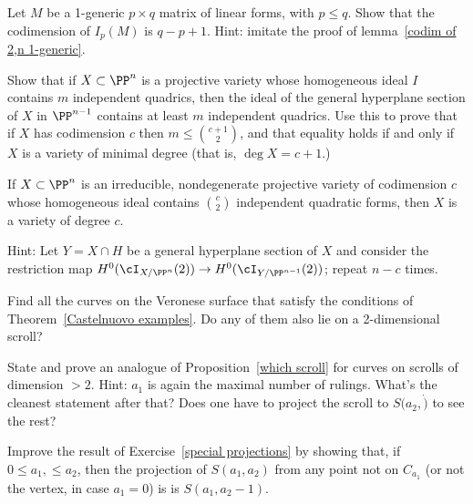 \begin{exercise}
Let $M$ be a 1-generic $p\times q$ matrix of linear forms, with $p\leq q$. Show that the codimension of
$I_p(M)$ is $q-p+1$. Hint: imitate the proof of lemma~\ref{codim of 2,n 1-generic}.
\end{exercise}

\begin{exercise}
Show that if $X\subset \PP^n$ is a projective variety whose homogeneous ideal $I$ contains $m$ independent quadrics, then the ideal of the general hyperplane section of $X$ in $\PP^{n-1}$
contains at least $m$ independent quadrics. Use this to prove that if $X$ has codimension $c$ then $m\leq {c+1\choose 2}$, and that equality holds if and only if
$X$ is a variety of minimal degree (that is, $\deg X = c+1$.)
\end{exercise}

\begin{exercise}\label{many quadrics}
 If $X \subset \PP^n$ is an irreducible, nondegenerate projective variety of codimension $c$ whose homogeneous ideal
 contains ${c\choose 2}$ independent quadratic forms, then $X$ is a variety of degree $c$.
 
Hint: Let $Y = X \cap H$ be a general hyperplane section of $X$ and consider the restriction map $H^0(\cI_{X/\PP^n}(2)) \to H^0(\cI_{Y/\PP^{n-1}}(2))$; repeat $n-c$ times.
\end{exercise}

\begin{exercise}\label{Castelnuovo Veronese}
Find all the curves on the Veronese surface that satisfy the conditions of 
 Theorem~\ref{Castelnuovo examples}. Do any of them also lie on a 2-dimensional scroll?
\end{exercise}


\begin{exercise}
State and prove an analogue of Proposition~\ref{which scroll} for curves on scrolls of dimension $>2$.
Hint: $a_1$ is again the maximal number of rulings. What's the cleanest statement after that? Does one have
to project the scroll to $S(a_2, \dot)$ to see the rest?
\end{exercise}


\begin{exercise}\label{general projections}
Improve the result of Exercise~\ref{special projections} by showing that, if $0\leq a_1,\leq a_2$, then
 the projection of $S(a_1,a_2)$ from any point not on $C_{a_1}$ (or not the vertex, in case $a_1=0$) is 
 is $S(a_1, a_2-1)$.
\end{exercise}

